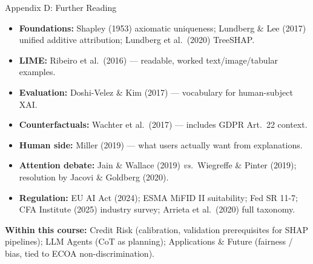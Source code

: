 \documentclass[9pt,t]{beamer}
\begin{document}
\begin{frame}[noframenumbering]{Appendix D: Further Reading}
\footnotesize
\begin{itemize}
  \item \textbf{Foundations:} Shapley (1953) axiomatic uniqueness; Lundberg \&
        Lee (2017) unified additive attribution; Lundberg et al.\ (2020) TreeSHAP.
  \item \textbf{LIME:} Ribeiro et al.\ (2016) --- readable, worked text/image/tabular examples.
  \item \textbf{Evaluation:} Doshi-Velez \& Kim (2017) --- vocabulary for human-subject XAI.
  \item \textbf{Counterfactuals:} Wachter et al.\ (2017) --- includes GDPR Art.\ 22 context.
  \item \textbf{Human side:} Miller (2019) --- what users actually want from explanations.
  \item \textbf{Attention debate:} Jain \& Wallace (2019) \emph{vs.}\ Wiegreffe \&
        Pinter (2019); resolution by Jacovi \& Goldberg (2020).
  \item \textbf{Regulation:} EU AI Act (2024); ESMA MiFID II suitability; Fed SR
        11-7; CFA Institute (2025) industry survey; Arrieta et al.\ (2020) full taxonomy.
\end{itemize}

\medskip
\textbf{Within this course:} Credit Risk (calibration, validation prerequisites
for SHAP pipelines); LLM Agents (CoT as planning); Applications \& Future
(fairness / bias, tied to ECOA non-discrimination).
\end{frame}
\end{document}
